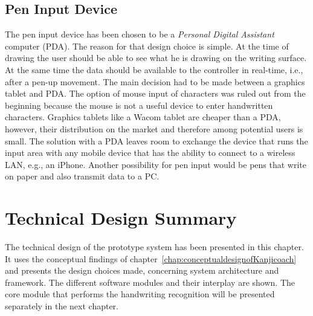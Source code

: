 \subsection{Pen Input Device}
\label{sec:peninputdevice}

The pen input device has been chosen to be a \emph{Personal Digital Assistant} 
computer (PDA). The reason for that design choice is simple. At the time of
drawing the user should be able to see what he is drawing on the writing surface.
At the same time the data should be available to the controller in real-time,
i.e., after a pen-up movement.
The main decision had to be made between a graphics tablet and PDA.
The option of mouse input of characters was ruled out from the beginning
because the mouse is not a useful device to enter handwritten characters.
Graphics tablets like a Wacom tablet are cheaper than a PDA, however,
their distribution on the market and therefore among potential users is small.
The solution with a PDA leaves room to exchange the device that runs the input
area with any mobile device that has the ability to connect to a wireless LAN,
e.g., an iPhone. Another possibility for pen input would be pens that write on 
paper and also transmit data to a PC. 

\section{Technical Design Summary}
\label{sec:techdesignsummary}

The technical design of the prototype system has been presented in this chapter.
It uses the conceptual findings of 
chapter~\ref{chap:conceptualdesignofKanjicoach} and presents the design
choices made, concerning system architecture and framework.
The different software modules and their interplay are shown.
The core module that performs the handwriting recognition will be presented
separately in the next chapter.
